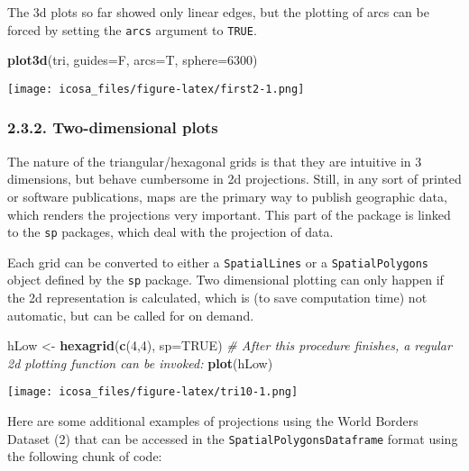 \documentclass[]{article}
\newenvironment{Shaded}{\begin{snugshade}}{\end{snugshade}}
\newcommand{\KeywordTok}[1]{\textcolor[rgb]{0.13,0.29,0.53}{\textbf{#1}}}
\newcommand{\DataTypeTok}[1]{\textcolor[rgb]{0.13,0.29,0.53}{#1}}
\newcommand{\DecValTok}[1]{\textcolor[rgb]{0.00,0.00,0.81}{#1}}
\newcommand{\StringTok}[1]{\textcolor[rgb]{0.31,0.60,0.02}{#1}}
\newcommand{\CommentTok}[1]{\textcolor[rgb]{0.56,0.35,0.01}{\textit{#1}}}
\newcommand{\OtherTok}[1]{\textcolor[rgb]{0.56,0.35,0.01}{#1}}
\newcommand{\NormalTok}[1]{#1}
\begin{document}
The 3d plots so far showed only linear edges, but the plotting of arcs
can be forced by setting the \texttt{arcs} argument to \texttt{TRUE}.

\begin{Shaded}
\begin{Highlighting}[]
\KeywordTok{plot3d}\NormalTok{(tri, }\DataTypeTok{guides=}\NormalTok{F, }\DataTypeTok{arcs=}\NormalTok{T, }\DataTypeTok{sphere=}\DecValTok{6300}\NormalTok{)}
\end{Highlighting}
\end{Shaded}

\texttt{[image: icosa\_files/figure-latex/first2-1.png]}

\subsubsection{2.3.2. Two-dimensional
plots}\label{two-dimensional-plots}

The nature of the triangular/hexagonal grids is that they are intuitive
in 3 dimensions, but behave cumbersome in 2d projections. Still, in any
sort of printed or software publications, maps are the primary way to
publish geographic data, which renders the projections very important.
This part of the package is linked to the \texttt{sp} packages, which
deal with the projection of data.

Each grid can be converted to either a \texttt{SpatialLines} or a
\texttt{SpatialPolygons} object defined by the \texttt{sp} package. Two
dimensional plotting can only happen if the 2d representation is
calculated, which is (to save computation time) not automatic, but can
be called for on demand.

\begin{Shaded}
\begin{Highlighting}[]
\NormalTok{hLow <-}\StringTok{ }\KeywordTok{hexagrid}\NormalTok{(}\KeywordTok{c}\NormalTok{(}\DecValTok{4}\NormalTok{,}\DecValTok{4}\NormalTok{), }\DataTypeTok{sp=}\OtherTok{TRUE}\NormalTok{)}
\CommentTok{# After this procedure finishes, a regular 2d plotting function can be invoked:}
\KeywordTok{plot}\NormalTok{(hLow)}
\end{Highlighting}
\end{Shaded}

\texttt{[image: icosa\_files/figure-latex/tri10-1.png]}

Here are some additional examples of projections using the World Borders
Dataset (2) that can be accessed in the
\texttt{SpatialPolygonsDataframe} format using the following chunk of
code:
\end{document}
